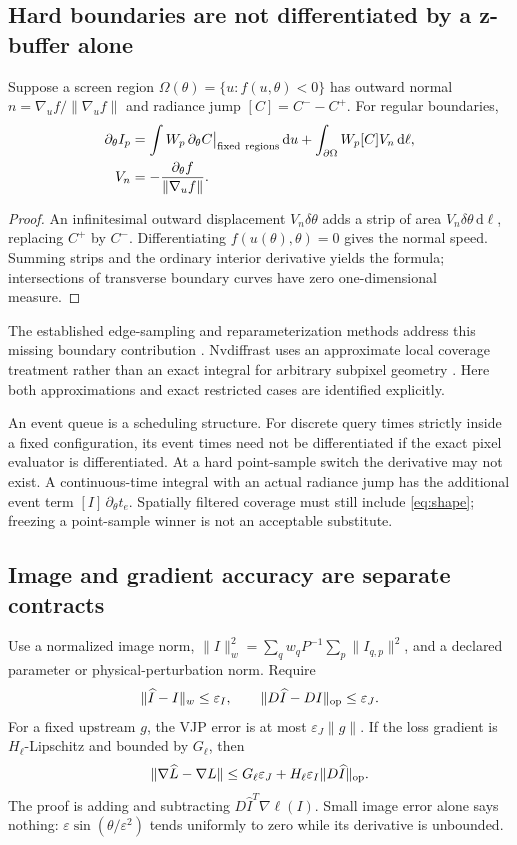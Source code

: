 \documentclass[10pt,letterpaper]{article}
\theoremstyle{remark}\newtheorem{counterexample}[proposition]{Counterexample}
\newcommand{\dd}{\,\mathrm d}
\newcommand{\eps}{\varepsilon}
\begin{document}
\subsection{Hard boundaries are not differentiated by a z-buffer alone}
Suppose a screen region $\Omega(\theta)=\{u:f(u,\theta)<0\}$ has outward normal $n=\nabla_uf/\|\nabla_uf\|$ and radiance jump $[C]=C^- - C^+$. For regular boundaries,
\begin{align}
 \partial_\theta I_p
 &=\int W_p\,\partial_\theta C\big|_{\rm fixed\ regions}\dd u
   +\int_{\partial\Omega}W_p[C]V_n\dd\ell,\\
 V_n&=-\frac{\partial_\theta f}{\|\nabla_uf\|}. \label{eq:shape}
\end{align}
\begin{proof}
An infinitesimal outward displacement $V_n\delta\theta$ adds a strip of area $V_n\delta\theta\dd\ell$, replacing $C^+$ by $C^-$. Differentiating $f(u(\theta),\theta)=0$ gives the normal speed. Summing strips and the ordinary interior derivative yields the formula; intersections of transverse boundary curves have zero one-dimensional measure.
\end{proof}
The established edge-sampling and reparameterization methods address this missing boundary contribution \cite{edges,reparam}. Nvdiffrast uses an approximate local coverage treatment rather than an exact integral for arbitrary subpixel geometry \cite{nvdiffrast}. Here both approximations and exact restricted cases are identified explicitly.

An event queue is a scheduling structure. For discrete query times strictly inside a fixed configuration, its event times need not be differentiated if the exact pixel evaluator is differentiated. At a hard point-sample switch the derivative may not exist. A continuous-time integral with an actual radiance jump has the additional event term $[I]\,\partial_\theta t_e$. Spatially filtered coverage must still include \eqref{eq:shape}; freezing a point-sample winner is not an acceptable substitute.

\subsection{Image and gradient accuracy are separate contracts}
Use a normalized image norm, $\|I\|_w^2=\sum_qw_qP^{-1}\sum_p\|I_{q,p}\|^2$, and a declared parameter or physical-perturbation norm. Require
\begin{equation}
 \|\widehat I-I\|_w\leq\eps_I,\qquad
 \|D\widehat I-DI\|_{\rm op}\leq\eps_J. \label{eq:accuracy}
\end{equation}
For a fixed upstream $g$, the VJP error is at most $\eps_J\|g\|$. If the loss gradient is $H_\ell$-Lipschitz and bounded by $G_\ell$, then
\begin{equation}
 \|\nabla\widehat L-\nabla L\|
 \leq G_\ell\eps_J+H_\ell\eps_I\|D\widehat I\|_{\rm op}.
\end{equation}
The proof is adding and subtracting $D\widehat I^T\nabla\ell(I)$. Small image error alone says nothing: $\eps\sin(\theta/\eps^2)$ tends uniformly to zero while its derivative is unbounded.
\end{document}

